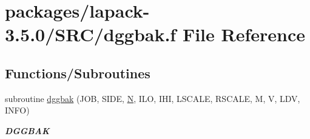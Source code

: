 \hypertarget{dggbak_8f}{}\section{packages/lapack-\/3.5.0/\+S\+R\+C/dggbak.f File Reference}
\label{dggbak_8f}
\subsection*{Functions/\+Subroutines}
\begin{DoxyCompactItemize}
\item 
subroutine \hyperlink{group__doubleGBcomputational_ga7b29af57a3c8be5f39ab997cb14c7eb6}{dggbak} (J\+O\+B, S\+I\+D\+E, \hyperlink{polmisc_8c_a0240ac851181b84ac374872dc5434ee4}{N}, I\+L\+O, I\+H\+I, L\+S\+C\+A\+L\+E, R\+S\+C\+A\+L\+E, M, V, L\+D\+V, I\+N\+F\+O)
\begin{DoxyCompactList}\small\item\em {\bfseries D\+G\+G\+B\+A\+K} \end{DoxyCompactList}\end{DoxyCompactItemize}
